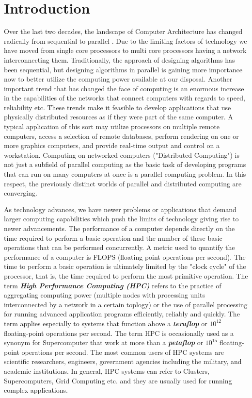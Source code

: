 \chapter{Introduction}\label{chapter:introduction}
Over the last two decades, the landscape of Computer Architecture has changed radically from sequential to parallel . Due to the limiting factors of technology we have moved from single core processors to multi core processors having a network interconnecting them. Traditionally, the approach of designing algorithms has been sequential, but designing algorithms in parallel is gaining more importance now to better utilize the computing power available at our disposal. Another important trend that has changed the face of computing is an enormous increase in the capabilities of the networks that connect computers with regards to speed, reliability etc. These trends make it feasible to develop applications that use physically distributed resources as if they were part of the same computer. A typical application of this sort may utilize processors on multiple remote computers, access a selection of remote databases, perform rendering on one or more graphics computers, and provide real-time output and control on a workstation. Computing on networked computers ("Distributed Computing") is not just a subfield of parallel computing as the basic task of developing programs that can run on many computers at once is a parallel computing problem. In this respect, the previously distinct worlds of parallel and distributed computing are converging.\\ \par
\noindent
As technology advances, we have newer problems or applications that demand larger computing capabilities which push the limits of technology giving rise to newer advancements. The performance of a computer depends directly on the time required to perform a basic operation and the number of these basic operations that can be performed concurrently. A metric used to quantify the performance of a computer is FLOPS (floating point operations per second). The time to perform a basic operation is ultimately limited by the "clock cycle" of the processor, that is, the time required to perform the most primitive operation. The term \textbf{\textit{High Performance Computing (HPC)}} refers to the practice of aggregating computing power (multiple nodes with processing units interconnected by a network in a certain toplogy) or the use of parallel processing for running advanced application programs efficiently, reliably and quickly. The term applies especially to systems that function above a \textbf{\textit{teraflop}} or \textbf{\textit{$10^{12}$}} floating-point operations per second. The term HPC is occasionally used as a synonym for Supercomputer that work at more than a \textbf{\textit{petaflop}} or \textbf{\textit{$10^{15}$}} floating-point operations per second. The most common users of HPC systems are scientific researchers, engineers, government agencies including the military, and academic institutions. In general, HPC systems can refer to Clusters, Supercomputers, Grid Computing etc. and they are usually used for running complex applications.\\ \par

